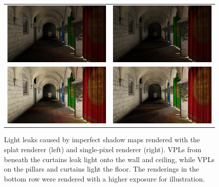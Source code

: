 \begin{figure}[htb]
\centering
  \begin{tabular}{@{}cc@{}}
    \includegraphics[width=.48\textwidth]{screenshots/leaks_splat} &
    \includegraphics[width=.48\textwidth]{screenshots/leaks_single_pixel}\\
    \includegraphics[width=.48\textwidth]{screenshots/leaks_splat_exposure} &
    \includegraphics[width=.48\textwidth]{screenshots/leaks_single_pixel_exposure}
  \end{tabular}
  \caption{Light leaks caused by imperfect shadow maps rendered with the splat renderer (left) and single-pixel renderer (right). VPLs from beneath the curtains leak light onto the wall and ceiling, while VPLs on the pillars and curtains light the floor. The renderings in the bottom row were rendered with a higher exposure for illustration. }
  \label{fig:results:leaks}
\end{figure}

